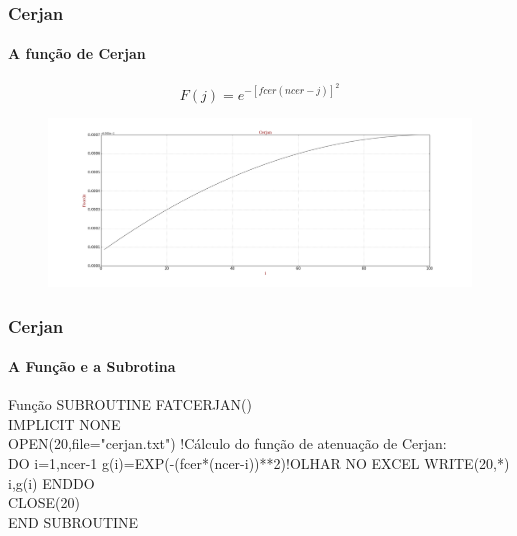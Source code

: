 \documentclass[10pt]{beamer} %
\begin{document}
\begin{frame}
	\frametitle{Cerjan}
	\framesubtitle{A função de Cerjan}
	\begin{block}{}
		\begin{equation}
			F(j)=e^{-[fcer(ncer-j)]^{2}}
		\end{equation}
		\label{cerjan}
	\end{block}
	\pause
	\begin{block}{}
		\begin{figure}[H]
			\centering
			\includegraphics[scale=0.20]{Imagens/cerjan.png}
		\end{figure}	
	\end{block}
\end{frame}	

\begin{frame}
	\frametitle{Cerjan}
	\framesubtitle{A Função e a Subrotina}
\begin{block}{Função}
	SUBROUTINE FATCERJAN()
	 \linebreak
	 \\
     IMPLICIT NONE
     \linebreak
     \\
     OPEN(20,file="cerjan.txt")
     !Cálculo do função de atenuação de Cerjan:
     \linebreak
     \\
     DO i=1,ncer-1
        g(i)=EXP(-(fcer*(ncer-i))**2)!OLHAR NO EXCEL
    	WRITE(20,*) i,g(i)
     ENDDO
     \linebreak
     \\
     CLOSE(20)
     \linebreak
		\\
	END SUBROUTINE
\end{block}
\end{frame}
\end{document}
